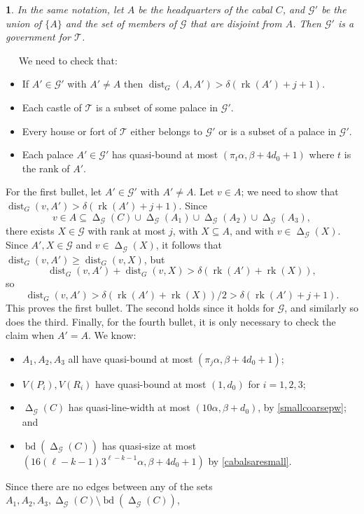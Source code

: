 \documentclass[titlepage,11pt]{article}
\newcommand{\dist}{\operatorname{dist}}
\newcommand{\voro}{\operatorname{\Delta}}
\newcommand{\rk}{\operatorname{rk}}
\newcommand{\gtype}{\operatorname{rk}}
\newcommand{\bd}{\operatorname{bd}}
\newcommand{\mac}{\mathcal}
\newtheorem{thm}{}[section]
\newcommand{\Proof}{\noindent{\bf Proof.}\ \ }
\begin{document}
	\begin{thm}\label{usecabal2}
		In the same notation, let $A$ be the headquarters of the cabal $C$, and $\mac G'$ be the union of $\{A\}$ and the set of members of $\mac G$
		that are disjoint from $A$. Then $\mac G'$ is a government for $\mac T$.
	\end{thm}
	\Proof
	We need to check that:
	\begin{itemize}
		\item If $A'\in \mac G'$ with $A'\ne A$
		then $\dist_G(A, A')> \delta(\rk(A')+j+1)$.
		\item Each castle of $\mac T$ is a subset of some palace in $\mac G'$.
		\item Every house or fort of $\mac T$ either belongs to $\mac G'$ or is a subset of a palace in $\mac G'$. 
		\item Each palace $A'\in \mac G'$ has quasi-bound at most
		$\left(\pi_t\alpha, \beta+4d_0+1 \right)$
		where $t$ is the rank of $A'$.
	\end{itemize}
	For the first bullet, let $A'\in \mac G'$ with $A'\ne A$. Let $v\in A$; we need to show that $\dist_G(v,A')>\delta(\gtype(A')+j+1)$.
	Since 
	$$v\in A\subseteq \voro_{\mac G}(C)\cup \voro_{\mac G}(A_1)\cup \voro_{\mac G}(A_2)\cup \voro_{\mac G}(A_3),$$
	there exists $X\in \mac G$ with rank at most $j$, with $X\subseteq A$, and with $v\in  \voro_{\mac G}(X)$. Since $A',X\in \mac G$ and 
	$v\in  \voro_{\mac G}(X)$, it follows that 
	$\dist_G(v,A')\ge \dist_G(v,X)$, but 
	$$\dist_G(v,A')+\dist_G(v,X)>\delta(\gtype(A')+\rk(X)),$$
	so
	$$\dist_G(v,A')> \delta(\gtype(A')+\rk(X))/2> \delta(\gtype(A')+j+1).$$
	This proves the first bullet.
	The second holds since it holds for $\mac G$, and similarly so does the third.
	Finally, for the fourth bullet, it is only necessary to check the claim when $A' = A$.
	We know:
	\begin{itemize}
		\item $A_1, A_2, A_3$ all have quasi-bound at most
		$(\pi_{j}\alpha, \beta+4d_0+1)$; 
		\item $V(P_i), V(R_i)$ have quasi-bound at most $(1,d_0)$ for $i = 1,2,3$;
		\item 
		$\voro_{\mac G}(C)$ has quasi-line-width at most $(10\alpha,\beta+d_0)$, by \ref{smallcoarsepw}; and 
		\item  $\bd(\voro_{\mac G}(C))$ has quasi-size at most
		$(16(\ell-k-1)3^{\ell-k-1}\alpha, \beta+4d_0+1)$ by \ref{cabalsaresmall}.
	\end{itemize}
	Since there are no edges between any of the sets $A_1, A_2, A_3, \voro_{\mac G}(C)\setminus \bd(\voro_{\mac G}(C))$, 
\end{document}
